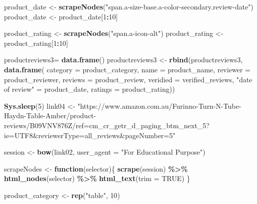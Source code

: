\documentclass[
]{article}
\newenvironment{Shaded}{\begin{snugshade}}{\end{snugshade}}
\newcommand{\AttributeTok}[1]{\textcolor[rgb]{0.13,0.29,0.53}{#1}}
\newcommand{\ConstantTok}[1]{\textcolor[rgb]{0.56,0.35,0.01}{#1}}
\newcommand{\ControlFlowTok}[1]{\textcolor[rgb]{0.13,0.29,0.53}{\textbf{#1}}}
\newcommand{\DecValTok}[1]{\textcolor[rgb]{0.00,0.00,0.81}{#1}}
\newcommand{\FunctionTok}[1]{\textcolor[rgb]{0.13,0.29,0.53}{\textbf{#1}}}
\newcommand{\NormalTok}[1]{#1}
\newcommand{\OtherTok}[1]{\textcolor[rgb]{0.56,0.35,0.01}{#1}}
\newcommand{\SpecialCharTok}[1]{\textcolor[rgb]{0.81,0.36,0.00}{\textbf{#1}}}
\newcommand{\StringTok}[1]{\textcolor[rgb]{0.31,0.60,0.02}{#1}}
\begin{document}
\begin{Shaded}
\begin{Highlighting}[]
\NormalTok{  product\_date }\OtherTok{\textless{}{-}} \FunctionTok{scrapeNodes}\NormalTok{(}\StringTok{"span.a{-}size{-}base.a{-}color{-}secondary.review{-}date"}\NormalTok{)}
\NormalTok{  product\_date }\OtherTok{\textless{}{-}}\NormalTok{ product\_date[}\DecValTok{1}\SpecialCharTok{:}\DecValTok{10}\NormalTok{]}
  
\NormalTok{  product\_rating }\OtherTok{\textless{}{-}} \FunctionTok{scrapeNodes}\NormalTok{(}\StringTok{"span.a{-}icon{-}alt"}\NormalTok{)}
\NormalTok{  product\_rating }\OtherTok{\textless{}{-}}\NormalTok{ product\_rating[}\DecValTok{1}\SpecialCharTok{:}\DecValTok{10}\NormalTok{]}
  
\NormalTok{  productreviews3}\OtherTok{=} \FunctionTok{data.frame}\NormalTok{()}
\NormalTok{  productreviews3 }\OtherTok{\textless{}{-}} \FunctionTok{rbind}\NormalTok{(productreviews3, }\FunctionTok{data.frame}\NormalTok{(}
                      \AttributeTok{category =}\NormalTok{ product\_category,}
                      \AttributeTok{name =}\NormalTok{ product\_name,}
                      \AttributeTok{reviewer =}\NormalTok{ product\_reviewer,}
                      \AttributeTok{reviews =}\NormalTok{ product\_review,}
                      \AttributeTok{veridied =}\NormalTok{ verified\_reviews,}
                      \StringTok{"date of review"} \OtherTok{=}\NormalTok{ product\_date,}
                      \AttributeTok{ratings =}\NormalTok{ product\_rating))}
  
   \FunctionTok{Sys.sleep}\NormalTok{(}\DecValTok{5}\NormalTok{)}
\NormalTok{link04 }\OtherTok{\textless{}{-}} \StringTok{"https://www.amazon.com.au/Furinno{-}Turn{-}N{-}Tube{-}Haydn{-}Table{-}Amber/product{-}reviews/B09VNV876Z/ref=cm\_cr\_getr\_d\_paging\_btm\_next\_5?ie=UTF8\&reviewerType=all\_reviews\&pageNumber=5"}


\NormalTok{  session }\OtherTok{\textless{}{-}} \FunctionTok{bow}\NormalTok{(link02,}
               \AttributeTok{user\_agent =} \StringTok{"For Educational Purpose"}\NormalTok{)}

\NormalTok{  scrapeNodes }\OtherTok{\textless{}{-}} \ControlFlowTok{function}\NormalTok{(selector)\{}
    \FunctionTok{scrape}\NormalTok{(session) }\SpecialCharTok{\%\textgreater{}\%}
      \FunctionTok{html\_nodes}\NormalTok{(selector) }\SpecialCharTok{\%\textgreater{}\%}
      \FunctionTok{html\_text}\NormalTok{(}\AttributeTok{trim =} \ConstantTok{TRUE}\NormalTok{)}
\NormalTok{  \}}

\NormalTok{  product\_category }\OtherTok{\textless{}{-}} \FunctionTok{rep}\NormalTok{(}\StringTok{"table"}\NormalTok{, }\DecValTok{10}\NormalTok{)}


\end{Highlighting}
\end{Shaded}
\end{document}
